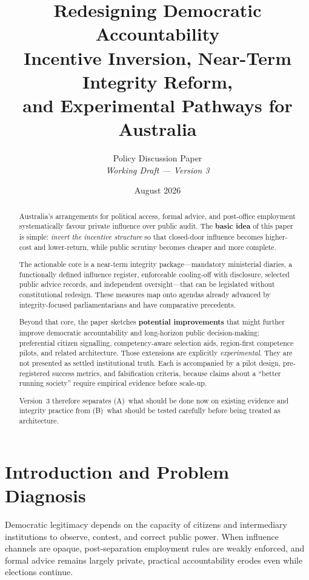 \documentclass[11pt,a4paper]{article}
\title{
\textbf{Redesigning Democratic Accountability}\\[0.3em]
\large Incentive Inversion, Near-Term Integrity Reform,\\
and Experimental Pathways for Australia
}
\author{
Policy Discussion Paper\\[0.4em]
\textit{Working Draft --- Version 3}
}
\date{August 2026}
\begin{document}
\maketitle


\begin{abstract}
\noindent
Australia’s arrangements for political access, formal advice, and post-office employment systematically favour private influence over public audit. The \textbf{basic idea} of this paper is simple: \emph{invert the incentive structure} so that closed-door influence becomes higher-cost and lower-return, while public scrutiny becomes cheaper and more complete.

The actionable core is a near-term integrity package---mandatory ministerial diaries, a functionally defined influence register, enforceable cooling-off with disclosure, selected public advice records, and independent oversight---that can be legislated without constitutional redesign. These measures map onto agendas already advanced by integrity-focused parliamentarians and have comparative precedents.

Beyond that core, the paper sketches \textbf{potential improvements} that might further improve democratic accountability and long-horizon public decision-making: preferential citizen signalling, competency-aware selection aids, region-first competence pilots, and related architecture. Those extensions are explicitly \emph{experimental}. They are not presented as settled institutional truth. Each is accompanied by a pilot design, pre-registered success metrics, and falsification criteria, because claims about a ``better running society'' require empirical evidence before scale-up.

Version~3 therefore separates (A)~what should be done now on existing evidence and integrity practice from (B)~what should be tested carefully before being treated as architecture.
\end{abstract}

\setcounter{tocdepth}{2}  %
\tableofcontents
\newpage

\section{Introduction and Problem Diagnosis}

Democratic legitimacy depends on the capacity of citizens and intermediary institutions to observe, contest, and correct public power. When influence channels are opaque, post-separation employment rules are weakly enforced, and formal advice remains largely private, practical accountability erodes even while elections continue.
\end{document}
